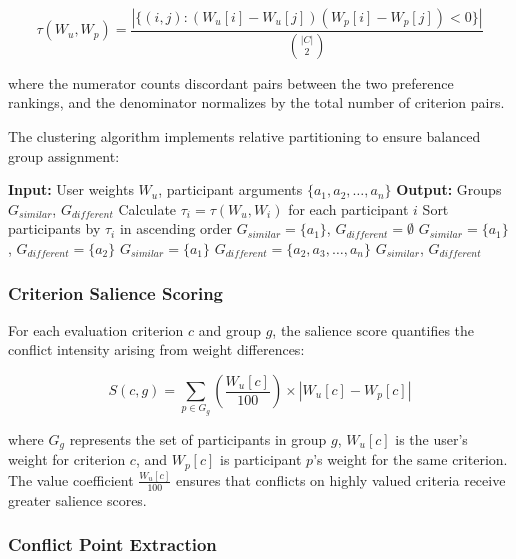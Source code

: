 \documentclass[conference]{IEEEtran}
\begin{document}
\begin{equation}
\tau(W_u, W_p) = \frac{|\{(i,j): (W_u[i] - W_u[j])(W_p[i] - W_p[j]) < 0\}|}{\binom{|C|}{2}}
\end{equation}

where the numerator counts discordant pairs between the two preference rankings, and the denominator normalizes by the total number of criterion pairs.

The clustering algorithm implements relative partitioning to ensure balanced group assignment:

\begin{algorithm}
\caption{Value Similarity Clustering}
\begin{algorithmic}
\STATE \textbf{Input:} User weights $W_u$, participant arguments $\{a_1, a_2, \ldots, a_n\}$
\STATE \textbf{Output:} Groups $G_{similar}$, $G_{different}$
\STATE 
\STATE Calculate $\tau_i = \tau(W_u, W_i)$ for each participant $i$
\STATE Sort participants by $\tau_i$ in ascending order
    \STATE $G_{similar} = \{a_1\}$, $G_{different} = \emptyset$
    \STATE $G_{similar} = \{a_1\}$, $G_{different} = \{a_2\}$
\ELSE
    \STATE $G_{similar} = \{a_1\}$
    \STATE $G_{different} = \{a_2, a_3, \ldots, a_n\}$
\ENDIF
\RETURN $G_{similar}$, $G_{different}$
\end{algorithmic}
\end{algorithm}

\subsubsection{Criterion Salience Scoring}

For each evaluation criterion $c$ and group $g$, the salience score quantifies the conflict intensity arising from weight differences:

\begin{equation}
S(c, g) = \sum_{p \in G_g} \left(\frac{W_u[c]}{100}\right) \times |W_u[c] - W_p[c]|
\end{equation}

where $G_g$ represents the set of participants in group $g$, $W_u[c]$ is the user's weight for criterion $c$, and $W_p[c]$ is participant $p$'s weight for the same criterion. The value coefficient $\frac{W_u[c]}{100}$ ensures that conflicts on highly valued criteria receive greater salience scores.

\subsubsection{Conflict Point Extraction}
\end{document}
